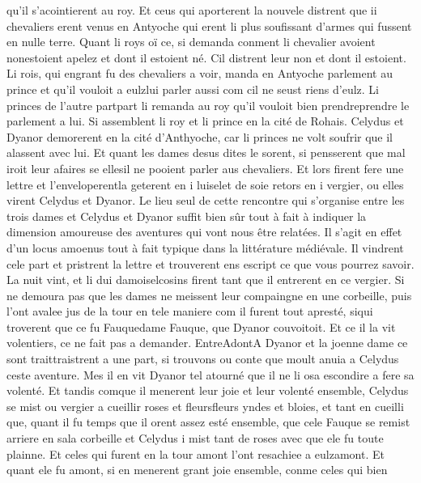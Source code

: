 \documentclass{article}
\begin{document}
\begin{pages}
   qu’il s’acointierent au roy. Et ceus qui aporterent la nouvele distrent que 
   ii chevaliers erent venus en Antyoche 
   qui erent li plus soufissant d’armes qui fussent en nulle terre. 
   Quant li roys oï ce, si demanda conment li chevalier 
      avoient nonestoient apelez et dont il estoient né. 
   Cil distrent leur non et dont il estoient. 
   Li rois, qui engrant fu des chevaliers a voir, 
   manda en Antyoche parlement au prince et 
   qu’il vouloit a eulzlui parler aussi 
      com cil ne seust riens d’eulz. 
   Li princes de l’autre partpart li 
   remanda au roy
   qu’il vouloit bien prendreprendre le 
      parlement a lui. 
   Si assemblent li roy et li prince 
   en la cité de Rohais. \pend 
\pstart Celydus et Dyanor 
   demorerent en la cité d’Anthyoche, car li princes 
   ne volt soufrir que il alassent avec lui. Et quant les dames desus dites le sorent, si pensserent que 
   mal iroit leur afaires se ellesil 
      ne pooient parler aus chevaliers. Et lors firent fere une lettre et 
   l'enveloperentla geterent en i luiselet de soie retors en 
   i vergier, ou elles virent Celydus et 
   Dyanor. Le lieu seul de cette rencontre qui s'organise entre 
   les trois dames et Celydus et Dyanor suffit bien sûr tout à fait à indiquer la dimension amoureuse des aventures qui vont 
   nous être relatées. Il s'agit en effet d'un locus amoenus tout à fait typique dans la littérature médiévale. 
   Il vindrent cele part et pristrent la lettre et trouverent 
   ens escript ce que vous pourrez savoir. 
   La nuit vint, et li dui 
   damoiselcosins firent 
   tant que il entrerent en 
   ce vergier. 
   Si ne demoura pas que les dames ne meissent leur compaingne en une corbeille, puis l’ont avalee jus de 
   la tour en tele maniere com 
   il furent tout apresté, siqui troverent que ce fu 
   Fauquedame Fauque, que 
   Dyanor couvoitoit. Et ce il la vit volentiers, ce ne fait pas a demander. 
   EntreAdontA Dyanor et 
   la joenne dame ce sont traittraistrent 
   a une part, si trouvons ou conte que 
   moult anuia a Celydus ceste aventure. Mes il en vit Dyanor 
   tel atourné que il ne li osa escondire a fere sa volenté. Et tandis comque 
   il menerent leur joie et leur volenté ensemble, Celydus se mist ou 
   vergier a cueillir roses et 
   fleursfleurs yndes et bloies, et tant en cueilli que, quant il fu temps 
   que il orent assez esté ensemble, que cele Fauque 
   se remist arriere en sala corbeille et 
   Celydus i mist tant de roses avec que ele fu toute plainne. Et celes qui furent en 
   la tour amont l’ont resachiee 
   a eulzamont. 
   Et quant ele fu amont, si en menerent grant joie ensemble, conme celes qui bien 

\end{pages}
\end{document}
